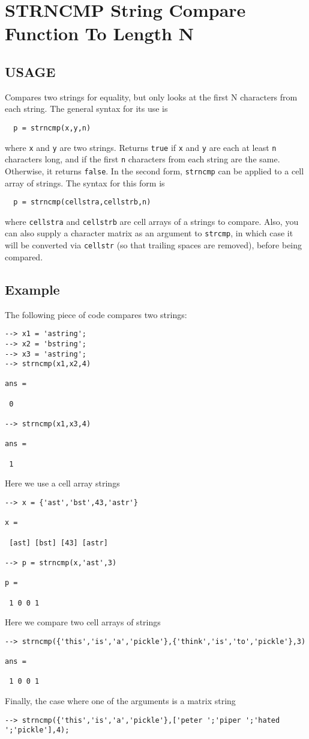 \section{STRNCMP String Compare Function To Length N }

\subsection{USAGE}

Compares two strings for equality, but only looks at the
first N characters from each string.  The general syntax 
for its use is
\begin{verbatim}
  p = strncmp(x,y,n)
\end{verbatim}
where \verb|x| and \verb|y| are two strings.  Returns \verb|true| if \verb|x|
and \verb|y| are each at least \verb|n| characters long, and if the
first \verb|n| characters from each string are the same.  Otherwise,
it returns \verb|false|.
In the second form, \verb|strncmp| can be applied to a cell array of
strings.  The syntax for this form is
\begin{verbatim}
  p = strncmp(cellstra,cellstrb,n)
\end{verbatim}
where \verb|cellstra| and \verb|cellstrb| are cell arrays of a strings
to compare.  Also, you can also supply a character matrix as
an argument to \verb|strcmp|, in which case it will be converted
via \verb|cellstr| (so that trailing spaces are removed), before being
compared.
\subsection{Example}

The following piece of code compares two strings:
\begin{verbatim}
--> x1 = 'astring';
--> x2 = 'bstring';
--> x3 = 'astring';
--> strncmp(x1,x2,4)

ans = 

 0 

--> strncmp(x1,x3,4)

ans = 

 1 
\end{verbatim}
Here we use a cell array strings
\begin{verbatim}
--> x = {'ast','bst',43,'astr'}

x = 

 [ast] [bst] [43] [astr] 

--> p = strncmp(x,'ast',3)

p = 

 1 0 0 1 
\end{verbatim}
Here we compare two cell arrays of strings
\begin{verbatim}
--> strncmp({'this','is','a','pickle'},{'think','is','to','pickle'},3)

ans = 

 1 0 0 1 
\end{verbatim}
Finally, the case where one of the arguments is a matrix
string
\begin{verbatim}
--> strncmp({'this','is','a','pickle'},['peter ';'piper ';'hated ';'pickle'],4);
\end{verbatim}
